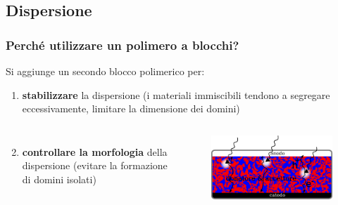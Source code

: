 \documentclass{beamer}
\begin{document}
\subsection{Dispersione}
\begin{frame}%
\frametitle{Perché utilizzare un polimero a blocchi?}

Si aggiunge un secondo blocco polimerico per:
\bigskip
\begin{enumerate}
\item \textbf{stabilizzare} la dispersione (i materiali immiscibili tendono a segregare eccessivamente, limitare la dimensione dei domini)
\end{enumerate}

\begin{columns}
\begin{enumerate}
\setcounter{enumi}{1}
\item \textbf{controllare la morfologia} della dispersione (evitare la formazione di domini isolati)
\end{enumerate}
\begin{figure}\centering \includegraphics[width=1\textwidth]{img/bhj4.pdf}\end{figure}
\end{columns}


\end{frame}
\end{document}
